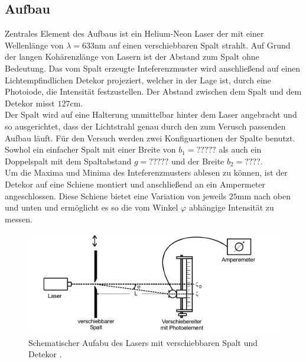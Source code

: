 \subsection{Aufbau}
Zentrales Element des Aufbaus ist ein Helium-Neon Laser der mit einer Wellenlänge von $\lambda = 633\si{\nano \meter}$ auf einen
verschiebbaren Spalt strahlt. Auf Grund der langen Kohärenzlänge von Lasern ist der Abstand zum Spalt ohne Bedeutung.
Das vom Spalt erzeugte Inteferenzmuster wird anschließend auf einen Lichtempfindlichen Detekor projeziert, 
welcher in der Lage ist, durch eine Photoiode, die Intensität festzustellen. Der Abstand zwischen dem Spalt und 
dem Detekor misst $127\si{\cm}$. 
\\
\newline
Der Spalt wird auf eine Halterung unmittelbar hinter dem Laser angebracht und so ausgerichtet, dass der Lichtstrahl 
genau durch den zum Verusch passenden Aufbau läuft. Für den Versuch werden zwei Konfiguartionen der Spalte benutzt. 
Sowhol ein einfacher Spalt mit einer Breite von $b_1=?????$ als auch ein Doppelspalt mit dem Spaltabstand $g=?????$ und der Breite $b_2=????$.
\\ 
\newline
Um die Maxima und Minima des Inteferenzmusters ablesen zu können, ist der Detekor auf eine Schiene montiert und anschließend an ein 
Ampermeter angeschlossen. 
Diese Schiene bietet eine Variation von jeweils $25 \si{\mm}$ nach oben und unten und ermöglicht es so die vom Winkel
$\varphi$ abhängige Intensität zu messen.
\begin{figure}
    \centering
    \includegraphics[width=\textwidth]{bilder/aufbau.png}
    \caption{Schematischer Aufabu des Lasers mit verschiebbaren Spalt und Detekor \cite{skript}.} 
    \label{fig:abb1}
\end{figure}

